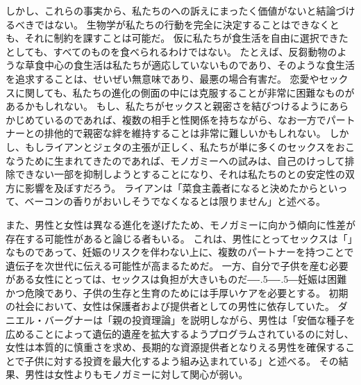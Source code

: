 \documentclass[paper=a4,book,openany]{jlreq}
\def\DDASH{―\kern-.5\zw―\kern-.5\zw―} %
\begin{document}
しかし、これらの事実から、私たちのへの訴えにまったく価値がないと結論づけるべきではない。
生物学が私たちの行動を完全に決定することはできなくとも、それに制約を課すことは可能だ。
仮に私たちが食生活を自由に選択できたとしても、すべてのものを食べられるわけではない。
たとえば、反芻動物のような草食中心の食生活は私たちが適応していないものであり、そのような食生活を追求することは、せいぜい無意味であり、最悪の場合有害だ。
恋愛やセックスに関しても、私たちの進化の側面の中には克服することが非常に困難なものがあるかもしれない。
もし、私たちがセックスと親密さを結びつけるようにあらかじめているのであれば、複数の相手と性関係を持ちながら、なお一方でパートナーとの排他的で親密な絆を維持することは非常に難しいかもしれない。
しかし、もしライアンとジェタの主張が正しく、私たちが単に多くのセックスをおこなうために生まれてきたのであれば、モノガミーへの試みは、自己のけっして排除できない一部を抑制しようとすることになり、それは私たちのとの安定性の双方に影響を及ぼすだろう。
ライアンは「菜食主義者になると決めたからといって、ベーコンの香りがおいしそうでなくなるとは限りません」と述べる\citep{bishop10:_ask_chris_ryan_ph}。

また、男性と女性は異なる進化を遂げたため、モノガミーに向かう傾向に性差が存在する可能性があると論じる者もいる。
これは、男性にとってセックスは「」なものであって、妊娠のリスクを伴わない上に、複数のパートナーを持つことで遺伝子を次世代に伝える可能性が高まるためだ。
一方、自分で子供を産む必要がある女性にとっては、セックスは負担が大きいものだ{\DDASH}妊娠は困難かつ危険であり、子供の生存と生育のためには手厚いケアを必要とする。
初期の社会において、女性は保護者および提供者としての男性に依存していた。
ダニエル・バーグナーは「親の投資理論」を説明しながら、男性は「安価な種子を広めることによって遺伝的遺産を拡大するようプログラムされているのに対し、女性は本質的に慎重さを求め、長期的な資源提供者となりえる男性を確保することで子供に対する投資を最大化するよう組み込まれている」と述べる\citep{bergner13:_unexc}。
その結果、男性は女性よりもモノガミーに対して関心が弱い。
\end{document}
